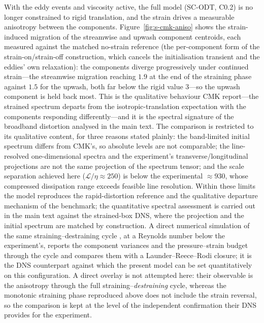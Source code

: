 \documentclass{JFM-FLM_Au}
\begin{document}
With the eddy events and viscosity active, the full model (SC-ODT, C0.2) is no longer constrained to rigid translation, and the strain drives a measurable anisotropy between the components. Figure~\ref{fig:s-cmk-aniso} shows
the strain-induced migration of the streamwise and upwash component
centroids, each measured against the matched no-strain reference (the per-component form of the strain-on/strain-off construction, which
cancels the initialisation transient and the eddies' own relaxation):
the components diverge progressively under continued strain---the
streamwise migration reaching $1.9$ at the end of the straining phase
against $1.5$ for the upwash, both far below the rigid value $3$---so
the upwash component is held back most. This is the qualitative
behaviour CMK report---the strained spectrum departs from the
isotropic-translation expectation with the components responding
differently---and it is the spectral signature of the broadband
distortion analysed in the main text. The comparison is restricted to
its qualitative content, for three reasons stated plainly: the
band-limited initial spectrum differs from CMK's, so absolute levels
are not comparable; the line-resolved one-dimensional spectra and the
experiment's transverse/longitudinal projections are not the same
projection of the spectrum tensor; and the scale separation achieved
here ($\mathcal{L}/\eta\approx250$) is below the experimental
$\approx930$, whose compressed dissipation range exceeds feasible line
resolution. Within these limits the model reproduces the
rapid-distortion reference and the qualitative departure mechanism of
the benchmark; the quantitative spectral assessment is carried out in
the main text against the strained-box DNS, where the projection and
the initial spectrum are matched by construction. A direct numerical
simulation of the same straining--destraining cycle
\citep{GualtieriMeneveau2010}, at a Reynolds number below the
experiment's, reports the component variances and the pressure--strain
budget through the cycle and compares them with a Launder--Reece--Rodi
closure; it is the DNS counterpart against which the present model can
be set quantitatively on this configuration. A direct overlay is not
attempted here: their observable is the anisotropy through the full
straining--\emph{destraining} cycle, whereas the monotonic straining
phase reproduced above does not include the
strain reversal, so the comparison is kept at the level of the
independent confirmation their DNS provides for the experiment.
\end{document}

